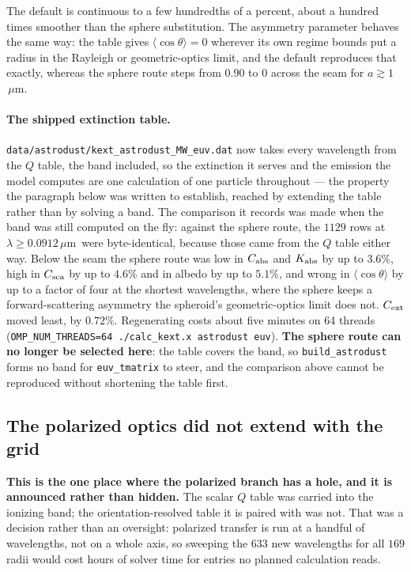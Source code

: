 \documentclass{my_memo}
\newcommand{\code}[1]{\texttt{#1}}
\newcommand{\um}{\ensuremath{\,\mu\mathrm{m}}}
\begin{document}
\noindent The default is continuous to a few hundredths of a percent, about a
hundred times smoother than the sphere substitution. The asymmetry parameter
behaves the same way: the table gives $\langle\cos\theta\rangle = 0$ wherever
its own regime bounds put a radius in the Rayleigh or geometric-optics limit,
and the default reproduces that exactly, whereas the sphere route steps from
$0.90$ to $0$ across the seam for $a\gtrsim1$\um.

\paragraph{The shipped extinction table.} \code{data/astrodust/kext\_astrodust\_MW\_euv.dat}
now takes every wavelength from the $Q$ table, the band included, so the
extinction it serves and the emission the model computes are one calculation of
one particle throughout --- the property the paragraph below was written to
establish, reached by extending the table rather than by solving a band. The
comparison it records was made when the band was still computed on the fly:
against the sphere route, the $1129$ rows at $\lambda\ge0.0912$\um\ were
byte-identical, because those came from the $Q$ table either way. Below the seam
the sphere route was
low in $C_{\rm abs}$ and $K_{\rm abs}$ by up to $3.6\%$, high in $C_{\rm sca}$
by up to $4.6\%$ and in albedo by up to $5.1\%$, and wrong in $\langle\cos
\theta\rangle$ by up to a factor of four at the shortest wavelengths, where the
sphere keeps a forward-scattering asymmetry the spheroid's geometric-optics
limit does not. $C_{\rm ext}$ moved least, by $0.72\%$. Regenerating costs
about five minutes on 64 threads
(\code{OMP\_NUM\_THREADS=64 ./calc\_kext.x astrodust euv}). \textbf{The sphere
route can no longer be selected here}: the table covers the band, so
\code{build\_astrodust} forms no band for \code{euv\_tmatrix} to steer, and the
comparison above cannot be reproduced without shortening the table first.

\subsection{The polarized optics did not extend with the grid}\label{sec:euv-pol}

\textbf{This is the one place where the polarized branch has a hole, and it is
announced rather than hidden.} The scalar $Q$ table was carried into the
ionizing band; the orientation-resolved table it is paired with was not. That
was a decision rather than an oversight: polarized transfer is run at a handful
of wavelengths, not on a whole axis, so sweeping the $633$ new wavelengths for
all $169$ radii would cost hours of solver time for entries no planned
calculation reads.
\end{document}
